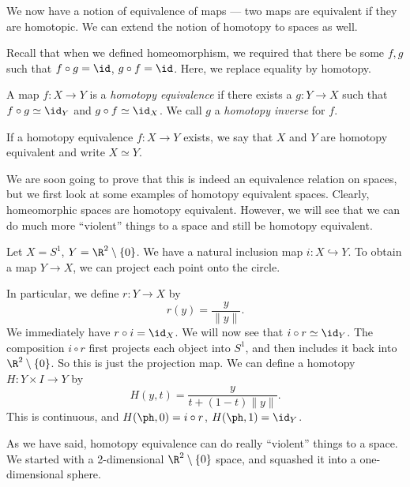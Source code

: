\documentclass[a4paper]{article}
\begin{document}
We now have a notion of equivalence of maps --- two maps are equivalent if they are homotopic. We can extend the notion of homotopy to spaces as well.

Recall that when we defined homeomorphism, we required that there be some $f, g$ such that $f\circ g = \id$, $g\circ f = \id$. Here, we replace equality by homotopy.
\begin{defi}
  A map $f: X\to Y$ is a \emph{homotopy equivalence} if there exists a $g: Y\to X$ such that $f\circ g \simeq \id_Y$ and $g\circ f \simeq \id_X$. We call $g$ a \emph{homotopy inverse} for $f$.

  If a homotopy equivalence $f: X\to Y$ exists, we say that $X$ and $Y$ are homotopy equivalent and write $X\simeq Y$.
\end{defi}
We are soon going to prove that this is indeed an equivalence relation on spaces, but we first look at some examples of homotopy equivalent spaces. Clearly, homeomorphic spaces are homotopy equivalent. However, we will see that we can do much more ``violent'' things to a space and still be homotopy equivalent.
\begin{eg}
  Let $X = S^1$, $Y = \R^2 \setminus \{0\}$. We have a natural inclusion map $i: X\hookrightarrow Y$. To obtain a map $Y \to X$, we can project each point onto the circle.
  \begin{center}
  \end{center}
  In particular, we define $r: Y\to X$ by
  \[
    r(y) = \frac{y}{\|y\|}.
  \]
  We immediately have $r\circ i = \id_X$. We will now see that $i\circ r \simeq \id_Y$. The composition $i\circ r$ first projects each object into $S^1$, and then includes it back into $\R^2 \setminus \{0\}$. So this is just the projection map. We can define a homotopy $H: Y\times I \to Y$ by
  \[
    H(y, t) = \frac{y}{t + (1 - t)\|y\|}.
  \]
  This is continuous, and $H(\ph, 0) = i\circ r$, $H(\ph, 1) = \id_Y$.
\end{eg}
As we have said, homotopy equivalence can do really ``violent'' things to a space. We started with a 2-dimensional $\R^2\setminus \{0\}$ space, and squashed it into a one-dimensional sphere.
\end{document}
